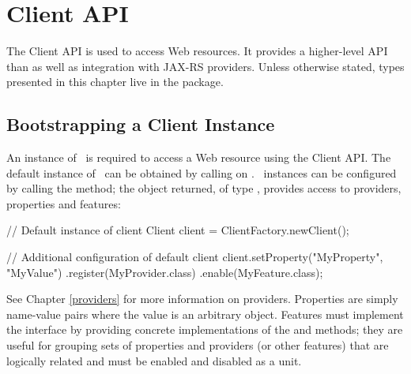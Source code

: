 \chapter{Client API}
\label{client_api}

The Client API is used to access Web resources. It provides a higher-level API than  as well as integration with JAX-RS providers. Unless otherwise stated, types presented in this chapter live in the  package.



\section{Bootstrapping a Client Instance}

An instance of \Client\ is required to access a Web resource using the Client API. The default instance of \Client\ can be obtained by calling  on \ClientFactory. \Client\ instances can be configured by calling the  method; the object returned, of type , provides access to providers, properties and features:

\begin{listing}{1}
// Default instance of client
Client client = ClientFactory.newClient();

// Additional configuration of default client
client.setProperty("MyProperty", "MyValue")
      .register(MyProvider.class)
      .enable(MyFeature.class);
\end{listing}

See Chapter \ref{providers} for more information on providers. Properties are simply name-value pairs where the value is an arbitrary object.  Features must implement the  interface by providing concrete implementations of the  and  methods; they are useful for grouping sets of properties and providers (or other features) that are logically related and must be enabled and disabled as a unit.

